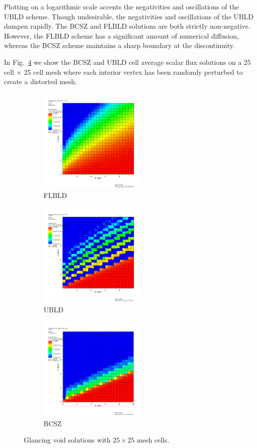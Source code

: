 \documentclass{mc2015}
\newcommand{\fig}[1]{Fig.~\ref{#1}}                      %
\begin{document}
Plotting on a logarithmic scale accents the negativities and oscillations of the UBLD scheme.
Though undesirable, the negativities and oscillations of the UBLD dampen rapidly.  
The BCSZ and FLBLD solutions are both strictly non-negative.  
However, the FLBLD scheme has a significant amount of numerical diffusion, whereas the BCSZ scheme maintains a sharp boundary at the discontinuity.

In \fig{fig:unstructured} we show the BCSZ and UBLD cell average scalar flux solutions on a 25 cell $\times$ 25 cell mesh where each interior vertex has been randomly perturbed to create a distorted mesh.
\begin{figure}[h]
	\begin{center}
	\begin{subfigure}{0.3\textwidth}
		\includegraphics[width=2in]{scb_unstruct.png}
		\caption{FLBLD}		
		\label{fig:unstructured_scb}
	\end{subfigure}
	\begin{subfigure}{0.3\textwidth}
		\includegraphics[width=2in]{bild_unstruct.png}
		\caption{UBLD}		
		\label{fig:unstructured_bild}
	\end{subfigure}
	\begin{subfigure}{0.3\textwidth}
		\includegraphics[width=2in]{bcsz_unstruct.png}
		\caption{BCSZ}
		\label{fig:unstructured_bcsz}
	\end{subfigure}		
	\caption{Glancing void solutions with $25\times 25$ mesh cells.}
	\label{fig:unstructured}
	\end{center}	
\end{figure}
\end{document}
